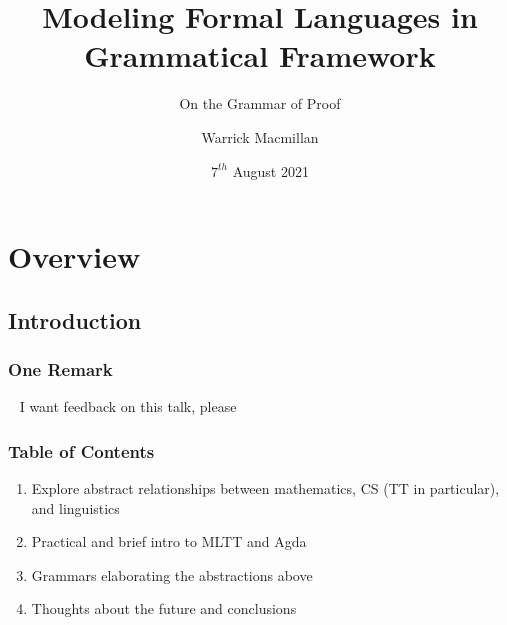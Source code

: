 \documentclass[9pt]{beamer}
\title{Modeling Formal Languages in Grammatical Framework}
\subtitle{On the Grammar of Proof}
\author{Warrick Macmillan}
\date{$7^{th}$ August 2021}
\begin{document}
\begin{frame}
  \titlepage
\end{frame}



\section{Overview}

\subsection{Introduction}

\begin{frame}
\frametitle{One Remark}

\begin{alertblock}{~}
I want feedback on this talk, please
\end{alertblock}

\end{frame}

\begin{frame}
\frametitle{Table of Contents}

\begin{enumerate}

\item Explore abstract relationships between mathematics, CS (TT in
  particular), and linguistics
\item Practical and brief intro to MLTT and Agda
\item Grammars elaborating the abstractions above
\item Thoughts about the future and conclusions
\end{enumerate}
\end{frame}
\end{document}
